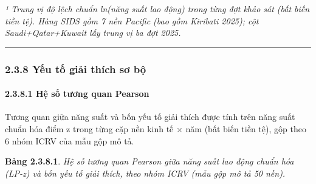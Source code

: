 \documentclass[
  a4paper,
  13pt]{extreport}
\begin{document}
\emph{¹ Trung vị độ lệch chuẩn ln(năng suất lao động) trong từng đợt
khảo sát (bất biến tiền tệ). Hàng SIDS gồm 7 nền Pacific (bao gồm
Kiribati 2025); cột Saudi+Qatar+Kuwait lấy trung vị ba đợt 2025.}

\begin{center}\rule{0.5\linewidth}{0.5pt}\end{center}

\hypertarget{yux1ebfu-tux1ed1-giux1ea3i-thuxedch-sux1a1-bux1ed9}{%
\subsubsection{2.3.8 Yếu tố giải thích sơ
bộ}\label{yux1ebfu-tux1ed1-giux1ea3i-thuxedch-sux1a1-bux1ed9}}

\hypertarget{hux1ec7-sux1ed1-tux1b0ux1a1ng-quan-pearson}{%
\paragraph{2.3.8.1 Hệ số tương quan
Pearson}\label{hux1ec7-sux1ed1-tux1b0ux1a1ng-quan-pearson}}

Tương quan giữa năng suất và bốn yếu tố giải thích được tính trên năng
suất chuẩn hóa điểm z trong từng cặp nền kinh tế × năm (bất biến tiền
tệ), gộp theo 6 nhóm ICRV của mẫu gộp mô tả.

\textbf{Bảng 2.3.8.1}. \emph{Hệ số tương quan Pearson giữa năng suất lao
động chuẩn hóa (LP-z) và bốn yếu tố giải thích, theo nhóm ICRV (mẫu gộp
mô tả 50 nền).}
\end{document}
